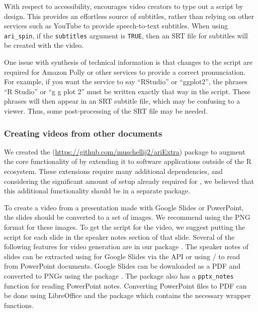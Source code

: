 With respect to accessibility,  encourages video creators to
type out a script by design. This provides an effortless source of
subtitles, rather than relying on other services such as YouTube to
provide speech-to-text subtitles. When using \texttt{ari\_spin}, if the
\texttt{subtitles} argument is \texttt{TRUE}, then an SRT file for
subtitles will be created with the video.

One issue with synthesis of technical information is that changes to the
script are required for Amazon Polly or other services to provide a
correct pronunciation. For example, if you want the service to say
``RStudio'' or ``ggplot2'', the phrases ``R Studio'' or ``g g plot 2''
must be written exactly that way in the script. These phrases will then
appear in an SRT subtitle file, which may be confusing to a viewer.
Thus, some post-processing of the SRT file may be needed.

\hypertarget{creating-videos-from-other-documents}{%
\subsubsection{Creating videos from other
documents}\label{creating-videos-from-other-documents}}

We created the 
(\url{https://github.com/muschellij2/ariExtra}) package to augment the
core functionality of  by extending it to software applications
outside of the R ecosystem. These extensions require many additional
dependencies, and considering the significant amount of setup already
required for , we believed that this additional functionality
should be in a separate package.

To create a video from a presentation made with Google Slides or
PowerPoint, the slides should be converted to a set of images. We
recommend using the PNG format for these images. To get the script for
the video, we suggest putting the script for each slide in the speaker
notes section of that slide. Several of the following features for video
generation are in our package . The speaker notes of
slides can be extracted using 
\citep{rgoogleslides} for Google Slides via the API or using
/ \citep{officer, readOffice} to
read from PowerPoint documents. Google Slides can be downloaded as a PDF
and converted to PNGs using the  package
\citep{pdftools}. The  package also has a
\texttt{pptx\_notes} function for reading PowerPoint notes. Converting
PowerPoint files to PDF can be done using LibreOffice and the
 package \citep{docxtractr} which contains the
necessary wrapper functions.


